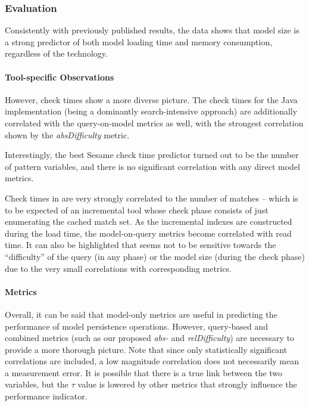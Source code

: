 \subsubsection{Evaluation}
Consistently with previously published results, the data shows that model size is a strong predictor of both model loading time and memory consumption, regardless of the technology.
\paragraph{Tool-specific Observations}
However, check times show a more diverse picture. The check times for the Java implementation (being a dominantly search-intensive approach) are additionally correlated with the query-on-model metrics as well, with the strongest correlation shown by the \emph{absDifficulty} metric. 

Interestingly, the best Sesame check time predictor turned out to be the number of pattern variables, and there is no significant correlation with any direct model metrics. 

Check times in \incquery{} are very strongly correlated to the number of matches -- which is to be expected of an incremental tool whose check phase consists of just enumerating the cached match set. As the incremental indexes are constructed during the load time, the model-on-query metrics become correlated with \incquery{} read time. It can also be highlighted that \incquery{} seems not to be sensitive towards the ``difficulty'' of the query (in any phase) or the model size (during the check phase) due to the very small correlations with corresponding metrics.
\paragraph{Metrics}
Overall, it can be said that model-only metrics are useful in predicting the performance of model persistence operations. However, query-based and combined metrics (such as our proposed \emph{abs-} and \emph{relDifficulty}) are necessary to provide a more thorough picture.
Note that since only statistically significant correlations are included, a low magnitude correlation does not necessarily mean a measurement error. It is possible that there is a true link between the two variables, but the $\tau$ value is lowered by other metrics that strongly influence the performance indicator. 

